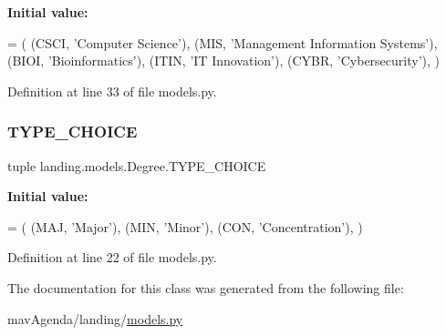 {\bfseries Initial value\+:}
\begin{DoxyCode}
=  (
        (CSCI, \textcolor{stringliteral}{'Computer Science'}),
        (MIS, \textcolor{stringliteral}{'Management Information Systems'}),
        (BIOI, \textcolor{stringliteral}{'Bioinformatics'}),
        (ITIN, \textcolor{stringliteral}{'IT Innovation'}),
        (CYBR, \textcolor{stringliteral}{'Cybersecurity'}),
    )
\end{DoxyCode}


Definition at line 33 of file models.\+py.

\mbox{\label{classlanding_1_1models_1_1Degree_a2e0c65757b0f59ed5c62ee8b2d517300}} 
\subsubsection{\texorpdfstring{T\+Y\+P\+E\+\_\+\+C\+H\+O\+I\+CE}{TYPE\_CHOICE}}
{\footnotesize\ttfamily tuple landing.\+models.\+Degree.\+T\+Y\+P\+E\+\_\+\+C\+H\+O\+I\+CE\hspace{0.3cm}{\ttfamily [static]}}

{\bfseries Initial value\+:}
\begin{DoxyCode}
=  (
        (MAJ, \textcolor{stringliteral}{'Major'}),
        (MIN, \textcolor{stringliteral}{'Minor'}),
        (CON, \textcolor{stringliteral}{'Concentration'}),
    )
\end{DoxyCode}


Definition at line 22 of file models.\+py.



The documentation for this class was generated from the following file\+:\begin{DoxyCompactItemize}
\item 
mav\+Agenda/landing/\mbox{\hyperlink{models_8py}{models.\+py}}\end{DoxyCompactItemize}
